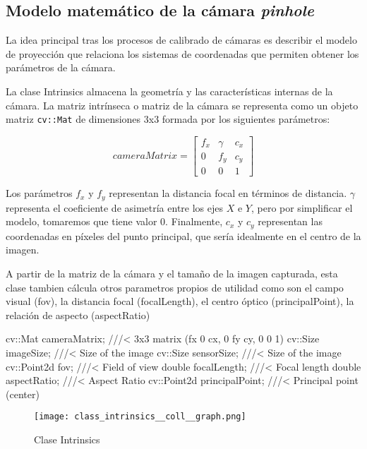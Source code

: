 \subsection{Modelo matemático de la cámara \textit{pinhole}}
La idea principal tras los procesos de calibrado de cámaras es describir el modelo de proyección que relaciona los sistemas de coordenadas que permiten obtener los parámetros de la cámara. 

La clase Intrinsics almacena la geometría y las características internas de la cámara. La matriz intrínseca o matriz de la cámara se representa como un objeto matriz \texttt{cv::Mat} de dimensiones 3x3 formada por los siguientes parámetros:

\begin{equation}
cameraMatrix=
\begin{bmatrix}
f_{x} & \gamma & c_{x} \\
0    & f_{y}   & c_{y} \\
0    & 0      & 1
\end{bmatrix}
\end{equation}

Los parámetros $f_{x}$ y $f_{y}$ representan la distancia focal en términos de distancia. $\gamma$ representa el coeficiente de asimetría entre los ejes $X$ e $Y$, pero por simplificar el modelo, tomaremos que tiene valor 0. Finalmente, $c_{x}$ y $c_{y}$ representan las coordenadas en píxeles del punto principal, que sería idealmente en el centro de la imagen.

A partir de la matriz de la cámara y el tamaño de la imagen capturada, esta clase tambien cálcula otros parametros propios de utilidad como son el campo visual (fov), la distancia focal (focalLength), el centro óptico (principalPoint), la relación de aspecto (aspectRatio) 


cv::Mat cameraMatrix;             ///< 3x3 matrix (fx 0 cx, 0 fy cy, 0 0 1)
cv::Size imageSize;               ///< Size of the image
cv::Size sensorSize;              ///< Size of the image
cv::Point2d fov;                  ///< Field of view
double focalLength;               ///< Focal length
double aspectRatio;               ///< Aspect Ratio
cv::Point2d principalPoint;       ///< Principal point (center)




\begin{figure}[h] 
  \centering
  \texttt{[image: class\_intrinsics\_\_coll\_\_graph.png]}
  \caption{Clase Intrinsics}
  \label{fig:classIntrinsics}
\end{figure}



